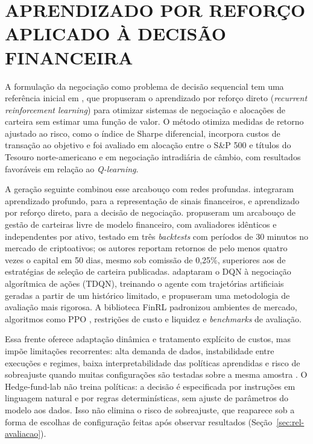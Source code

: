 \documentclass{eic-bcc-tcc}
\begin{document}
\section{APRENDIZADO POR REFORÇO APLICADO À DECISÃO FINANCEIRA}

A formulação da negociação como problema de decisão sequencial \citep{SuttonBarto2018} tem uma referência inicial em \citet{Moody2001}, que propuseram o aprendizado por reforço direto (\textit{recurrent reinforcement learning}) para otimizar sistemas de negociação e alocações de carteira sem estimar uma função de valor. O método otimiza medidas de retorno ajustado ao risco, como o índice de Sharpe diferencial, incorpora custos de transação ao objetivo e foi avaliado em alocação entre o S\&P 500 e títulos do Tesouro norte-americano e em negociação intradiária de câmbio, com resultados favoráveis em relação ao \textit{Q-learning}.

A geração seguinte combinou esse arcabouço com redes profundas. \citet{Deng2017} integraram aprendizado profundo, para a representação de sinais financeiros, e aprendizado por reforço direto, para a decisão de negociação. \citet{Jiang2017} propuseram um arcabouço de gestão de carteiras livre de modelo financeiro, com avaliadores idênticos e independentes por ativo, testado em três \textit{backtests} com períodos de 30 minutos no mercado de criptoativos; os autores reportam retornos de pelo menos quatro vezes o capital em 50 dias, mesmo sob comissão de 0,25\%, superiores aos de estratégias de seleção de carteira publicadas. \citet{Theate2021} adaptaram o DQN à negociação algorítmica de ações (TDQN), treinando o agente com trajetórias artificiais geradas a partir de um histórico limitado, e propuseram uma metodologia de avaliação mais rigorosa. A biblioteca FinRL \citep{FinRL2020} padronizou ambientes de mercado, algoritmos como PPO \citep{Schulman2017}, restrições de custo e liquidez e \textit{benchmarks} de avaliação.

Essa frente oferece adaptação dinâmica e tratamento explícito de custos, mas impõe limitações recorrentes: alta demanda de dados, instabilidade entre execuções e regimes, baixa interpretabilidade das políticas aprendidas e risco de sobreajuste quando muitas configurações são testadas sobre a mesma amostra \citep{Bailey2017}. O Hedge-fund-lab não treina políticas: a decisão é especificada por instruções em linguagem natural e por regras determinísticas, sem ajuste de parâmetros do modelo aos dados. Isso não elimina o risco de sobreajuste, que reaparece sob a forma de escolhas de configuração feitas após observar resultados (Seção~\ref{sec:rel-avaliacao}).
\end{document}
